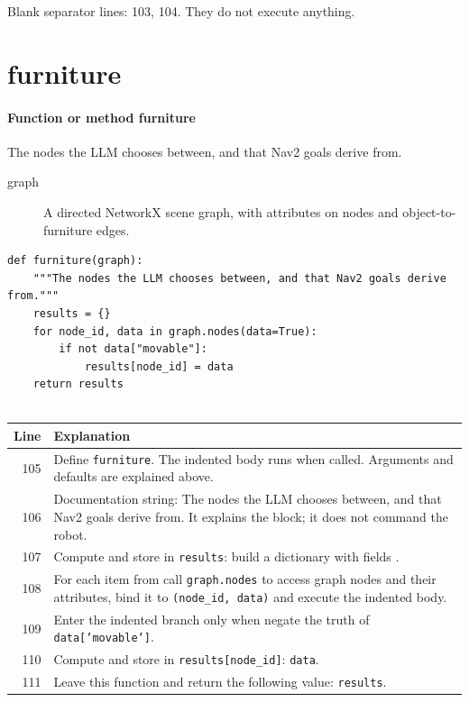 \documentclass[11pt,a4paper]{book}
\begin{document}
Blank separator lines: 103, 104. They do not execute anything.

\section{furniture}

\paragraph{Function or method furniture}
The nodes the LLM chooses between, and that Nav2 goals derive from.

\begin{description}
\item[graph] A directed NetworkX scene graph, with attributes on nodes and object-to-furniture edges.
\end{description}

\begin{lstlisting}[firstnumber=105]
def furniture(graph):
    """The nodes the LLM chooses between, and that Nav2 goals derive from."""
    results = {}
    for node_id, data in graph.nodes(data=True):
        if not data["movable"]:
            results[node_id] = data
    return results


\end{lstlisting}

\begin{longtable}{r p{}}

\textbf{Line} & \textbf{Explanation} \\ \hline \endhead

105 & Define \texttt{furniture}. The indented body runs when called. Arguments and defaults are explained above. \\

106 & Documentation string: The nodes the LLM chooses between, and that Nav2 goals derive from. It explains the block; it does not command the robot. \\

107 & Compute and store in \texttt{results}: build a dictionary with fields \texttt{}.  \\

108 & For each item from call \texttt{graph.nodes} to access graph nodes and their attributes, bind it to \texttt{(node\_id, data)} and execute the indented body. \\

109 & Enter the indented branch only when negate the truth of \texttt{data['movable']}. \\

110 & Compute and store in \texttt{results[node\_id]}: \texttt{data}.  \\

111 & Leave this function and return the following value: \texttt{results}. \\

\end{longtable}
\end{document}
